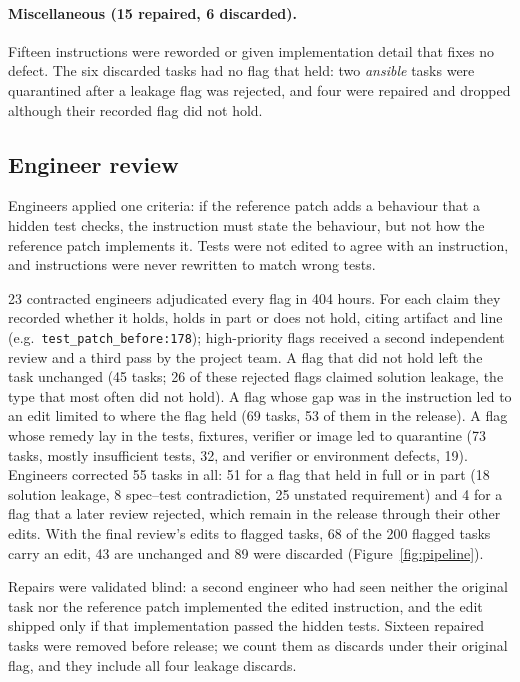 \paragraph{Miscellaneous (15 repaired, 6 discarded).}
Fifteen instructions were reworded or given implementation detail that fixes no defect. The six discarded tasks had no flag that held: two \textit{ansible} tasks were quarantined after a leakage flag was rejected, and four were repaired and dropped although their recorded flag did not hold.


\subsection{Engineer review}
\label{sec:review}

Engineers applied one criteria: if the reference patch adds a behaviour that a hidden test checks, the instruction must state the behaviour, but not how the reference patch implements it. Tests were not edited to agree with an instruction, and instructions were never rewritten to match wrong tests.

23 contracted engineers adjudicated every flag in 404 hours. For each claim they recorded whether it holds, holds in part or does not hold, citing artifact and line (e.g.\ \texttt{test\_patch\_before:178}); high-priority flags received a second independent review and a third pass by the project team. A flag that did not hold left the task unchanged (45 tasks; 26 of these rejected flags claimed solution leakage, the type that most often did not hold). A flag whose gap was in the instruction led to an edit limited to where the flag held (69 tasks, 53 of them in the release). A flag whose remedy lay in the tests, fixtures, verifier or image led to quarantine (73 tasks, mostly insufficient tests, 32, and verifier or environment defects, 19). Engineers corrected 55 tasks in all: 51 for a flag that held in full or in part (18 solution leakage, 8 spec--test contradiction, 25 unstated requirement) and 4 for a flag that a later review rejected, which remain in the release through their other edits. With the final review's edits to flagged tasks, 68 of the 200 flagged tasks carry an edit, 43 are unchanged and 89 were discarded (Figure~\ref{fig:pipeline}).

Repairs were validated blind: a second engineer who had seen neither the original task nor the reference patch implemented the edited instruction, and the edit shipped only if that implementation passed the hidden tests. Sixteen repaired tasks were removed before release; we count them as discards under their original flag, and they include all four leakage discards.

